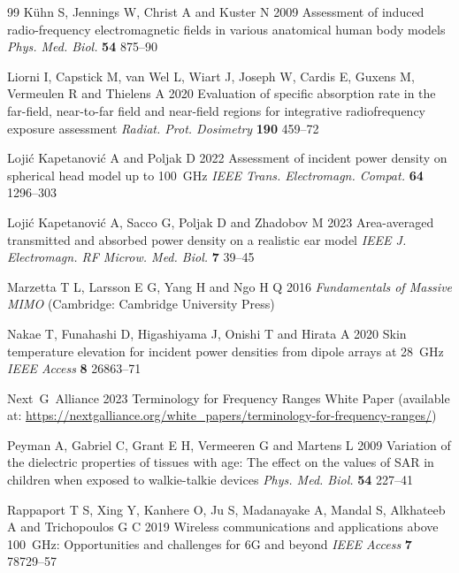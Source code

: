 \documentclass{iopjournal}
\begin{document}
\begin{thebibliography}{99}
K{\"u}hn S, Jennings W, Christ A and Kuster N 2009 Assessment of induced radio-frequency electromagnetic fields in various anatomical human body models \emph{Phys. Med. Biol.} \textbf{54} 875--90

Liorni I, Capstick M, van Wel L, Wiart J, Joseph W, Cardis E, Guxens M, Vermeulen R and Thielens A 2020 Evaluation of specific absorption rate in the far-field, near-to-far field and near-field regions for integrative radiofrequency exposure assessment \emph{Radiat. Prot. Dosimetry} \textbf{190} 459--72

Loji\'{c} Kapetanovi\'{c} A and Poljak D 2022 Assessment of incident power density on spherical head model up to 100~GHz \emph{IEEE Trans. Electromagn. Compat.} \textbf{64} 1296--303

Loji\'{c} Kapetanovi\'{c} A, Sacco G, Poljak D and Zhadobov M 2023 Area-averaged transmitted and absorbed power density on a realistic ear model \emph{IEEE J. Electromagn. RF Microw. Med. Biol.} \textbf{7} 39--45

Marzetta T L, Larsson E G, Yang H and Ngo H Q 2016 \emph{Fundamentals of Massive MIMO} (Cambridge: Cambridge University Press)

Nakae T, Funahashi D, Higashiyama J, Onishi T and Hirata A 2020 Skin temperature elevation for incident power densities from dipole arrays at 28~GHz \emph{IEEE Access} \textbf{8} 26863--71

Next~G~Alliance 2023 Terminology for Frequency Ranges White Paper (available at: \url{https://nextgalliance.org/white_papers/terminology-for-frequency-ranges/})

Peyman A, Gabriel C, Grant E H, Vermeeren G and Martens L 2009 Variation of the dielectric properties of tissues with age: The effect on the values of SAR in children when exposed to walkie-talkie devices \emph{Phys. Med. Biol.} \textbf{54} 227--41

Rappaport T S, Xing Y, Kanhere O, Ju S, Madanayake A, Mandal S, Alkhateeb A and Trichopoulos G C 2019 Wireless communications and applications above 100~GHz: Opportunities and challenges for 6G and beyond \emph{IEEE Access} \textbf{7} 78729--57


\end{thebibliography}
\end{document}
